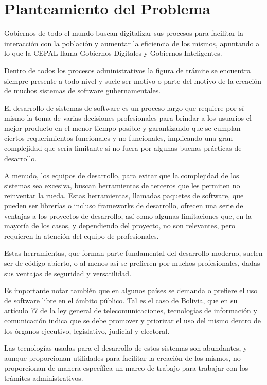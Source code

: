 \section{Planteamiento del Problema}
Gobiernos de todo el mundo buscan digitalizar sus procesos para facilitar la interacción con la población y aumentar la eficiencia de los mismos, apuntando a lo que la CEPAL llama Gobiernos Digitales y Gobiernos Inteligentes. 

Dentro de todos los procesos administrativos la figura de trámite se encuentra siempre presente a todo nivel y suele ser motivo o parte del motivo de la creación de muchos sistemas de software gubernamentales.

El desarrollo de sistemas de software es un proceso largo que requiere por sí mismo la toma de varias decisiones profesionales para brindar a los usuarios el mejor producto en el menor tiempo posible y garantizando que se cumplan ciertos requerimientos funcionales y no funcionales, implicando una gran complejidad que sería limitante si no fuera por algunas buenas prácticas de desarrollo.

A menudo, los equipos de desarrollo, para evitar que la complejidad de los sistemas sea excesiva, buscan herramientas de terceros que les permiten no reinventar la rueda. Estas herramientas, llamadas paquetes de software, que pueden ser librerías o incluso frameworks de desarrollo, ofrecen una serie de ventajas a los proyectos de desarrollo, así como algunas limitaciones que, en la mayoría de los casos, y dependiendo del proyecto, no son relevantes, pero requieren la atención del equipo de profesionales.

Estas herramientas, que forman parte fundamental del desarrollo moderno, suelen ser de código abierto, o al menos así se prefieren por muchos profesionales, dadas sus ventajas de seguridad y versatilidad.

Es importante notar también que en algunos países se demanda o prefiere el uso de software libre en el ámbito público. Tal es el caso de Bolivia, que en su artículo 77 de la ley general de telecomunicaciones, tecnologías de información y comunicación indica que se debe promover y priorizar el uso del mismo dentro de los órganos ejecutivo, legislativo, judicial y electoral.

Las tecnologías usadas para el desarrollo de estos sistemas son abundantes, y aunque proporcionan utilidades para facilitar la creación de los mismos, no proporcionan de manera específica un marco de trabajo para trabajar con los trámites administrativos.

